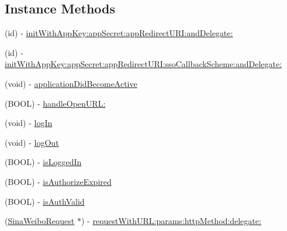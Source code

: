 \subsection*{Instance Methods}
\begin{DoxyCompactItemize}
\item 
(id) -\/ \hyperlink{interfaceSinaWeibo_a408d060c799e1befe8392fbd3c2ff3a6}{init\+With\+App\+Key\+:app\+Secret\+:app\+Redirect\+U\+R\+I\+:and\+Delegate\+:}
\item 
(id) -\/ \hyperlink{interfaceSinaWeibo_a9fd776c3dae6bf7b83a3ca724b39741c}{init\+With\+App\+Key\+:app\+Secret\+:app\+Redirect\+U\+R\+I\+:sso\+Callback\+Scheme\+:and\+Delegate\+:}
\item 
(void) -\/ \hyperlink{interfaceSinaWeibo_a25e35513f1e08bce93767002a4cc033e}{application\+Did\+Become\+Active}
\item 
(B\+O\+OL) -\/ \hyperlink{interfaceSinaWeibo_a68219880919ba0f8a902e17ca79a9158}{handle\+Open\+U\+R\+L\+:}
\item 
(void) -\/ \hyperlink{interfaceSinaWeibo_a953a72271fc1ece0b642989834068f18}{log\+In}
\item 
(void) -\/ \hyperlink{interfaceSinaWeibo_a36f57431cea7641d660f3031138d6313}{log\+Out}
\item 
(B\+O\+OL) -\/ \hyperlink{interfaceSinaWeibo_a9e6b35bab485a4a712486d323893f4a2}{is\+Logged\+In}
\item 
(B\+O\+OL) -\/ \hyperlink{interfaceSinaWeibo_a94e0b3b239568b2d5ca8f920622c0b25}{is\+Authorize\+Expired}
\item 
(B\+O\+OL) -\/ \hyperlink{interfaceSinaWeibo_a29d41dae95cdc485a2d49d4ac7091d84}{is\+Auth\+Valid}
\item 
(\hyperlink{interfaceSinaWeiboRequest}{Sina\+Weibo\+Request} $\ast$) -\/ \hyperlink{interfaceSinaWeibo_a7bf415eba4182dfe73dc90e8e4b2b675}{request\+With\+U\+R\+L\+:params\+:http\+Method\+:delegate\+:}
\end{DoxyCompactItemize}

